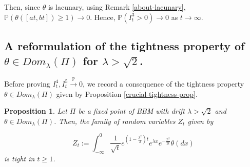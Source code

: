 \documentclass[a4paper,reqno]{amsart}%
\newcommand{\1}{\mathbf 1}
\theoremstyle{mine}
\numberwithin{theorem}{section}
\newtheorem{proposition}[theorem]{Proposition}
\numberwithin{equation}{section}
\theoremstyle{remark}
\begin{document}
Then, since $\theta$ is lacunary, using Remark \ref{about-lacunary}, $\mathbb{P}(\theta([at, bt]) \geq 1) \to 0$. Hence, $\mathbb{P}(I_t^3>0) \to 0$ as $t\to \infty$. 


\subsection{A reformulation of the tightness property of $\theta \in Dom_{\lambda}(\Pi)$ for $\lambda > \sqrt{2}$.}

Before proving $I_t^4, I_t^5 \overset{\mathbb{P}}{\to} 0$, we record a consequence of the tightness property $\theta \in Dom_{\lambda}(\Pi)$ given by Proposition \ref{crucial-tightness-prop}. 

\begin{proposition}\label{replace-M-by-explicit-expression-in-tightness}
    Let $\Pi$ be a fixed point of BBM with drift $\lambda > \sqrt{2}$ and $\theta \in Dom_{\lambda}(\Pi)$. Then, the family of random variables $Z_t$ given by 

\begin{equation}
  Z_t := \int_{- \infty}^0 \frac{1}{\sqrt{t}}e^{(1-\frac{\lambda^2}{2})t}e^{\lambda x}e^{-\frac{x^2}{2t}}\theta(dx) 
\end{equation}
is tight in $t\geq 1$. 
\end{proposition} 
\end{document}
